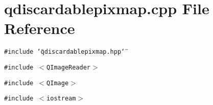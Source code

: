 \section{qdiscardablepixmap.cpp File Reference}
\label{qdiscardablepixmap_8cpp}
{\tt \#include \char`\"{}qdiscardablepixmap.hpp\char`\"{}}\par
{\tt \#include $<$QImage\-Reader$>$}\par
{\tt \#include $<$QImage$>$}\par
{\tt \#include $<$iostream$>$}\par
